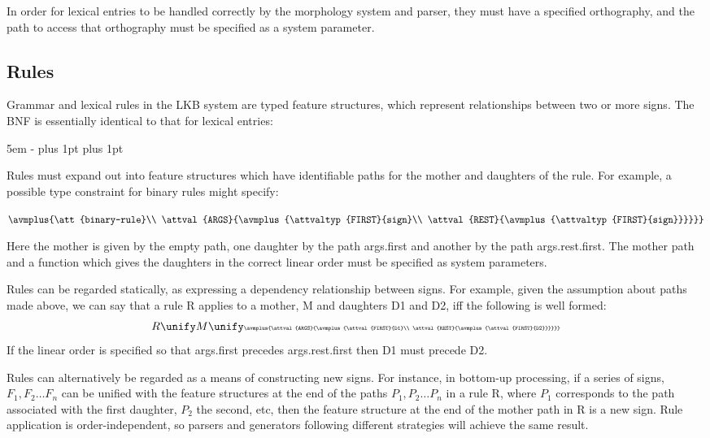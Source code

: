 \documentclass[12pt]{report}
\begin{document}
In order for lexical entries to be handled correctly by
the morphology system and parser, they must have a specified
orthography, and the path to access that orthography
must be specified as a system parameter.

\subsection{Rules}
\label{rules}
Grammar and lexical rules in the LKB 
system are typed feature structures,
which represent relationships between two or more signs.
The BNF is essentially identical to that for
lexical entries:
\begin{list}{}
   {\leftmargin 5em
    \itemindent -\leftmargin
    \itemsep 0pt plus 1pt
    \parsep 0pt plus 1pt}
\end{list}

Rules must expand out into feature structures which have identifiable paths
for the mother and daughters of the rule.  For example,
a possible type constraint for binary rules might specify:
\begin{center}
{\tiny
   $\avmplus{\att{binary-rule}\\
             \attval{ARGS}{\avmplus{\attvaltyp{FIRST}{sign}\\
                                    \attval{REST}{\avmplus{\attvaltyp{FIRST}{sign}}}}}}$}
\end{center}
Here the mother is given by the empty path, one daughter 
by the path {\feature args}.{\feature first} and another by the path
{\feature args}.{\feature rest}.{\feature first}.  
The mother path and a function which gives the
daughters in the correct linear order must be specified as system parameters.

Rules can be regarded statically,
as expressing a dependency relationship between signs.
For example, given the assumption about paths made above, 
we can say that a rule R applies to a mother, M and daughters D1 and D2,
iff the following is well
formed:
\[
R \unify M \unify
\mbox{\tiny
   $\avmplus{\attval{ARGS}{\avmplus{\attval{FIRST}{D1}\\
                                    \attval{REST}{\avmplus{\attval{FIRST}{D2}}}}}}$}
\] 
If the linear order is specified so that {\feature args.first} precedes
{\feature args.rest.first} then D1 must precede D2.


Rules can alternatively be regarded as a means of constructing
new signs.  For
instance, in bottom-up processing,
if a series of signs, $F_{1}, F_{2} \ldots F_n$ can be unified 
with the feature structures at the end of the paths $P_{1}, P_{2} \ldots P_{n}$
in a rule R, where $P_{1}$ corresponds to the path associated with the
first daughter, $P_{2}$ the second, etc,
then the feature structure at the end of
the mother path in R is a new sign.  
Rule application is order-independent, so parsers and generators 
following different 
strategies will achieve the same result.  
\end{document}

